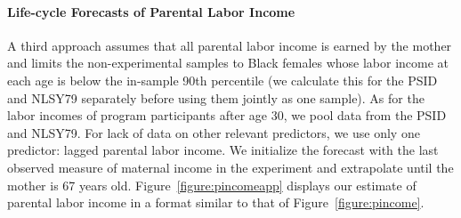 \paragraph{Life-cycle Forecasts of Parental Labor Income} \label{appendix:lcyclepincome}

\noindent A third approach assumes that all parental labor income is earned by the mother and limits the non-experimental samples to Black females whose labor income at each age is below the in-sample 90th percentile (we calculate this for the PSID and NLSY79 separately before using them jointly as one sample). As for the labor incomes of program participants after age 30, we pool data from the PSID and NLSY79. For lack of data on other relevant predictors, we use only one predictor: lagged parental labor income. We initialize the forecast with the last observed measure of maternal income in the experiment and extrapolate until the mother is 67 years old. Figure~\ref{figure:pincomeapp} displays our estimate of parental labor income in a format similar to that of Figure~\ref{figure:pincome}.


